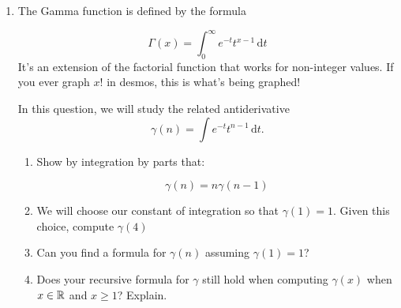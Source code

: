 \begin{enumerate}
    \newpage
    \item The Gamma function is defined by the formula 

    \[
        \Gamma(x) = \int_0^\infty e^{-t}t^{x-1}\,\mathrm dt
    \]
    It's an extension of the factorial function that works for non-integer values. If you ever graph $x!$ in desmos, this is what's being graphed!

    In this question, we will study the related antiderivative
    \[
        \gamma(n) = \int e^{-t}t^{n-1}\,\mathrm dt.
    \]
    
    \begin{enumerate}
    
        \item Show by integration by parts that:

        \[
            \gamma(n) = n\gamma(n-1)
        \]
        \item We will choose our constant of integration so that $\gamma(1)=1$.
        Given this choice, compute $\gamma(4)$
        \item Can you find a formula for $\gamma(n)$ assuming $\gamma(1)=1$?
        \item Does your recursive formula for $\gamma$ still hold
        when computing $\gamma(x)$ when $x\in \mathbb{R}$ and $x\geq 1$? Explain.
    \end{enumerate}    
\end{enumerate}

















